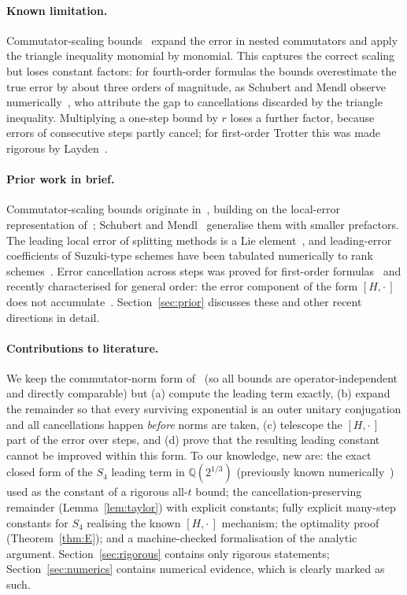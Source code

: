 \documentclass[11pt]{article}
\newcommand{\Qc}{\mathbb{Q}(2^{1/3})}
\theoremstyle{plain}
\theoremstyle{definition}
\theoremstyle{remark}
\begin{document}
\paragraph{Known limitation.} Commutator-scaling bounds~\cite{Childs2021} expand the error in nested
commutators and apply the triangle inequality monomial by monomial. This captures the correct scaling
but loses constant factors: for fourth-order formulas the bounds overestimate the true error by about
three orders of magnitude, as Schubert and Mendl observe numerically~\cite{SchubertMendl2023}, who
attribute the gap to cancellations discarded by the triangle inequality. Multiplying a one-step bound by
$r$ loses a further factor, because errors of consecutive steps partly cancel; for first-order Trotter
this was made rigorous by Layden~\cite{Layden2022}.

\paragraph{Prior work in brief.} Commutator-scaling bounds originate
in~\cite{ChildsSu2019,Childs2021}, building on the local-error representation
of~\cite{DescombesThalhammer2010}; Schubert and Mendl~\cite{SchubertMendl2023} generalise them with
smaller prefactors. The leading local error of splitting methods is a Lie element~\cite{AuzingerHerfort2014},
and leading-error coefficients of Suzuki-type schemes have been tabulated numerically to rank
schemes~\cite{McLachlan1995,Omelyan2002,BarthelZhang2020,Ostmeyer2023}. Error cancellation across steps
was proved for first-order formulas~\cite{Tran2020,Layden2022} and recently characterised for general
order: the error component of the form $[H,\cdot\,]$ does not accumulate~\cite{ChenYH2025,ChenXuYuanZhao2026}.
Section~\ref{sec:prior} discusses these and other recent directions in detail.

\paragraph{Contributions to literature.} We keep the commutator-norm form of~\cite{Childs2021} (so all bounds are
operator-independent and directly comparable) but (a) compute the leading term exactly, (b) expand the
remainder so that every surviving exponential is an outer unitary conjugation and all cancellations
happen \emph{before} norms are taken, (c) telescope the $[H,\cdot\,]$ part of the error over steps, and
(d) prove that the resulting leading constant cannot be improved within this form. To our
knowledge, new are: the exact closed form of the $S_4$ leading term in $\Qc$ (previously known
numerically~\cite{BarthelZhang2020}) used as the constant of a rigorous all-$t$ bound; the
cancellation-preserving remainder (Lemma~\ref{lem:taylor}) with explicit constants; fully explicit
many-step constants for $S_4$ realising the known $[H,\cdot\,]$ mechanism; the optimality proof
(Theorem~\ref{thm:E}); and a machine-checked formalisation of the analytic argument.
Section~\ref{sec:rigorous} contains only rigorous statements; Section~\ref{sec:numerics} contains
numerical evidence, which is clearly marked as such.
\end{document}
